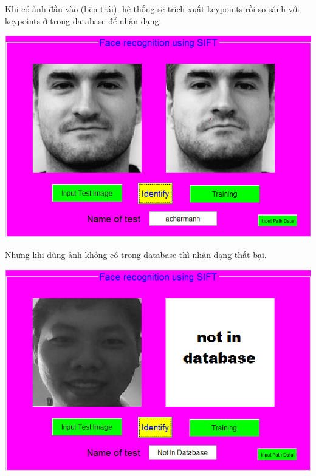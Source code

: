 \documentclass[landscape,a0paper,fontscale=0.285]{baposter} %
\begin{document}
\begin{poster}
{\begin{multicols}{2}
Khi có ảnh đầu vào (bên trái), hệ thống sẽ trích xuất keypoints rồi so sánh với keypoints ở trong database để nhận dạng.

\vspace{1em}
\begin{center}
\includegraphics[width=1\linewidth]{ketqua1}
\end{center}
\end{multicols}


\begin{multicols}{2}
\vspace{1em}
Nhưng khi dùng ảnh không có trong database thì nhận dạng thất bại.

\begin{center}
\includegraphics[width=1\linewidth]{ketqua2}
\end{center}


\end{multicols}}
\end{poster}
\end{document}
